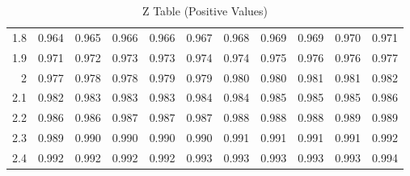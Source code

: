 \documentclass[11pt]{book}\usepackage[]{graphicx}\usepackage[]{color}
\begin{document}
\begin{table}[ht]
\begin{tabular}{rllllllllll}
  1.8 & 0.964 & 0.965 & 0.966 & 0.966 & 0.967 & 0.968 & 0.969 & 0.969 & 0.970 & 0.971 \\ 
  1.9 & 0.971 & 0.972 & 0.973 & 0.973 & 0.974 & 0.974 & 0.975 & 0.976 & 0.976 & 0.977 \\ 
  2 & 0.977 & 0.978 & 0.978 & 0.979 & 0.979 & 0.980 & 0.980 & 0.981 & 0.981 & 0.982 \\ 
  2.1 & 0.982 & 0.983 & 0.983 & 0.983 & 0.984 & 0.984 & 0.985 & 0.985 & 0.985 & 0.986 \\ 
  2.2 & 0.986 & 0.986 & 0.987 & 0.987 & 0.987 & 0.988 & 0.988 & 0.988 & 0.989 & 0.989 \\ 
  2.3 & 0.989 & 0.990 & 0.990 & 0.990 & 0.990 & 0.991 & 0.991 & 0.991 & 0.991 & 0.992 \\ 
  2.4 & 0.992 & 0.992 & 0.992 & 0.992 & 0.993 & 0.993 & 0.993 & 0.993 & 0.993 & 0.994 \\ 
   \hline
\end{tabular}
\caption{Z Table (Positive Values)} 
\end{table}

\label{TBL61}

\twocolumn

\section{}
\end{document}
